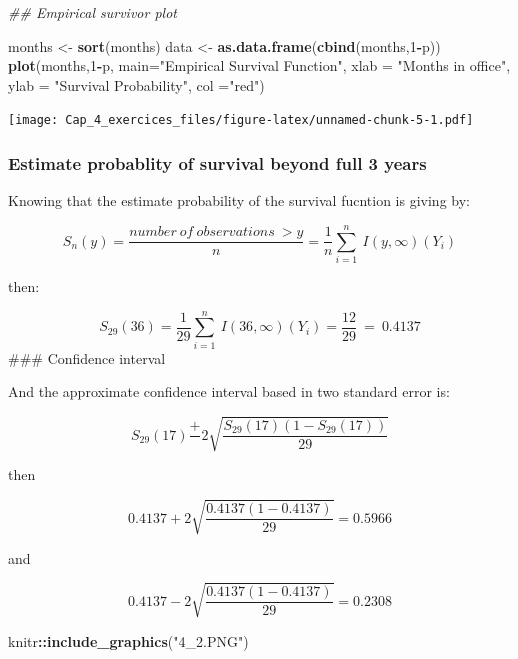 \documentclass[
]{article}
\newenvironment{Shaded}{\begin{snugshade}}{\end{snugshade}}
\newcommand{\CommentTok}[1]{\textcolor[rgb]{0.56,0.35,0.01}{\textit{#1}}}
\newcommand{\DataTypeTok}[1]{\textcolor[rgb]{0.13,0.29,0.53}{#1}}
\newcommand{\DecValTok}[1]{\textcolor[rgb]{0.00,0.00,0.81}{#1}}
\newcommand{\KeywordTok}[1]{\textcolor[rgb]{0.13,0.29,0.53}{\textbf{#1}}}
\newcommand{\NormalTok}[1]{#1}
\newcommand{\OperatorTok}[1]{\textcolor[rgb]{0.81,0.36,0.00}{\textbf{#1}}}
\newcommand{\StringTok}[1]{\textcolor[rgb]{0.31,0.60,0.02}{#1}}
\begin{document}
\begin{Shaded}
\begin{Highlighting}[]
\CommentTok{## Empirical survivor plot}

\NormalTok{months <-}\StringTok{ }\KeywordTok{sort}\NormalTok{(months)}
\NormalTok{data <-}\StringTok{ }\KeywordTok{as.data.frame}\NormalTok{(}\KeywordTok{cbind}\NormalTok{(months,}\DecValTok{1}\OperatorTok{-}\NormalTok{p))}
\KeywordTok{plot}\NormalTok{(months,}\DecValTok{1}\OperatorTok{-}\NormalTok{p, }\DataTypeTok{main=}\StringTok{"Empirical Survival Function"}\NormalTok{, }\DataTypeTok{xlab =} \StringTok{"Months in office"}\NormalTok{, }\DataTypeTok{ylab =} \StringTok{"Survival Probability"}\NormalTok{, }\DataTypeTok{col =}\StringTok{"red"}\NormalTok{)}
\end{Highlighting}
\end{Shaded}

\texttt{[image: Cap\_4\_exercices\_files/figure-latex/unnamed-chunk-5-1.pdf]}

\hypertarget{estimate-probablity-of-survival-beyond-full-3-years}{%
\subsubsection{Estimate probablity of survival beyond full 3
years}\label{estimate-probablity-of-survival-beyond-full-3-years}}

Knowing that the estimate probability of the survival fucntion is giving
by:

\[S_n\left(y\right)=\frac{number\:of\:observations\:>y}{n}=\frac{1}{n}\sum _{i=1}^n\:I\left(y,\infty \right)\left(Y_i\right)\]

then:

\[S_{29}\left(36\right)=\frac{1}{29}\sum _{i=1}^n\:I\left(36,\infty \right)\left(Y_i\right)=\frac{12}{29}\:=\:0.4137\]
\#\#\# Confidence interval

And the approximate confidence interval based in two standard error is:

\[S_{29}\left(17\right)\frac{+}{ }2\sqrt{\frac{S_{29}\left(17\right)\left(1-S_{29}\left(17\right)\right)}{29}}\]

then

\[0.4137+2\sqrt{\frac{0.4137\left(1-0.4137\right)}{29}}=0.5966\]

and

\[0.4137-2\sqrt{\frac{0.4137\left(1-0.4137\right)}{29}}=0.2308\]

\begin{Shaded}
\begin{Highlighting}[]
\NormalTok{knitr}\OperatorTok{::}\KeywordTok{include_graphics}\NormalTok{(}\StringTok{"4_2.PNG"}\NormalTok{)}
\end{Highlighting}
\end{Shaded}
\end{document}
